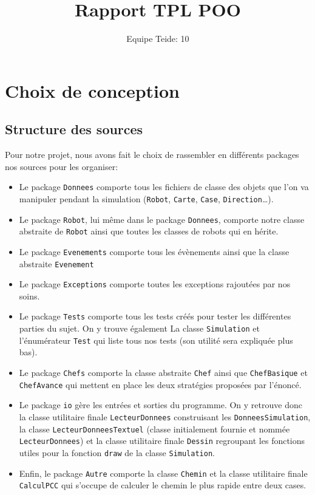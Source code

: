 \documentclass[a4paper,8pt]{article} %
\title{Rapport TPL POO}
\author{Equipe Teide: 10}
\date{} %
\begin{document}
\maketitle
\section{Choix de conception}
\subsection{Structure des sources} %
Pour notre projet, nous avons fait le choix de rassembler en différents packages nos sources pour les organiser: 
\begin{itemize}
    \item Le package \texttt{Donnees} comporte tous les fichiers de classe des objets que l'on va manipuler pendant
    la simulation (\texttt{Robot}, \texttt{Carte}, \texttt{Case}, \texttt{Direction}\ldots).
    \item Le package \texttt{Robot}, lui même dans le package \texttt{Donnees}, comporte notre classe abstraite de \texttt{Robot} ainsi
    que toutes les classes de robots qui en hérite.
    \item Le package \texttt{Evenements} comporte tous les évènements ainsi que la classe abstraite \texttt{Evenement}
    \item Le package \texttt{Exceptions} comporte toutes les exceptions rajoutées par nos soins.
    \item Le package \texttt{Tests} comporte tous les tests créés pour tester les différentes parties du sujet. On y trouve également
    La classe \texttt{Simulation} et l'énumérateur \texttt{Test} qui liste tous nos tests (son utilité sera expliquée plus bas).
    \item Le package \texttt{Chefs} comporte la classe abstraite \texttt{Chef} ainsi que \texttt{ChefBasique} et \texttt{ChefAvance} qui mettent
    en place les deux stratégies proposées par l'énoncé.
    \item Le package \texttt{io} gère les entrées et sorties du programme. 
    On y retrouve donc la classe utilitaire finale \texttt{LecteurDonnees} construisant les \texttt{DonneesSimulation}, la classe \texttt{LecteurDonneesTextuel} (classe initialement fournie et nommée \texttt{LecteurDonnees}) et la classe utilitaire finale \texttt{Dessin} regroupant les fonctions utiles pour la fonction \texttt{draw} de la classe \texttt{Simulation}. 
    \item Enfin, le package \texttt{Autre} comporte la classe \texttt{Chemin} et la classe utilitaire finale \texttt{CalculPCC} qui s'occupe de calculer le chemin le plus rapide entre deux cases.
    
\end{itemize}
\end{document}
